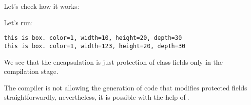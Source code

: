 

Let's check how it works:



Let's run:

\begin{lstlisting}
this is box. color=1, width=10, height=20, depth=30
this is box. color=1, width=123, height=20, depth=30
\end{lstlisting}

We see that the encapsulation is just protection of class fields only in the compilation stage.

The \Cpp compiler is not allowing the generation of code that modifies protected 
fields straightforwardly, nevertheless,
it is possible with the help of .

